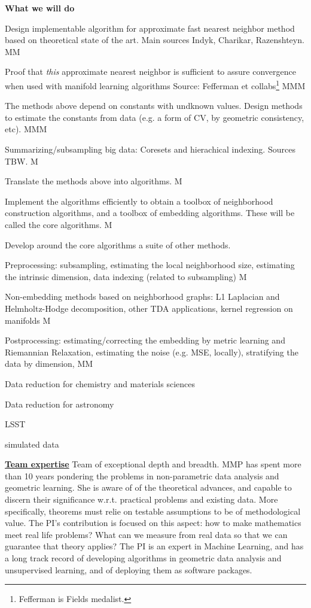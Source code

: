 \documentclass[floatfix,11pt]{article}
\begin{document}
{\bf What we will do}
\bit
\item Design implementable algorithm for approximate fast nearest neighbor method based on theoretical state of the art. Main sources Indyk, Charikar, Razenshteyn. MM
\item Proof that {\em this} approximate nearest neighbor is sufficient to assure convergence when used with manifold learning algorithms Source: Fefferman et collabs\footnote{Fefferman is Fields medalist.} MMM
\item The methods above depend on constants with undknown values. Design methods to estimate the constants from data (e.g. a form of CV, by geometric consistency, etc). MMM
\item Summarizing/subsampling big data: Coresets and hierachical indexing. Sources TBW. M 
\item Translate the methods above into algorithms. M
\item Implement the algorithms efficiently to obtain a toolbox of neighborhood construction algorithms, and a toolbox of embedding algorithms. These will be called the core algorithms. M
\item Develop around the core algorithms a suite of other methods.
 \bit
 \item Preprocessing: subsampling, estimating the local neighborhood size, estimating the intrinsic dimension, data indexing (related to subsampling) M
 \item Non-embedding methods based on neighborhood graphs: L1 Laplacian and Helmholtz-Hodge decomposition, other TDA applications, kernel regression on manifolds M
 \item Postprocessing: estimating/correcting the embedding by metric learning and Riemannian Relaxation, estimating the noise (e.g. MSE, locally), stratifying the data by dimension, MM
   \eit
 \item Data reduction for chemistry and materials sciences
 \item Data reduction for astronomy 
   \bit
 \item LSST
 \item simulated data
   \eit
 \eit


\underline{\bf Team expertise} Team of exceptional depth and breadth.
MMP has spent more than 10 years pondering the problems in non-parametric data analysis and geometric learning. She is aware of of the theoretical advances, and capable to discern their significance w.r.t. practical problems and existing data. More specifically, theorems must relie on testable assumptions to be of methodological value. The PI's contribution is focused on this aspect: how to make mathematics meet real life problems? What can we measure from real data so that we can guarantee that theory applies?
The PI is an expert in Machine Learning, and has a long track record of developing algorithms in geometric data analysis and unsupervised learning, and of deploying them as software packages.
\end{document}
